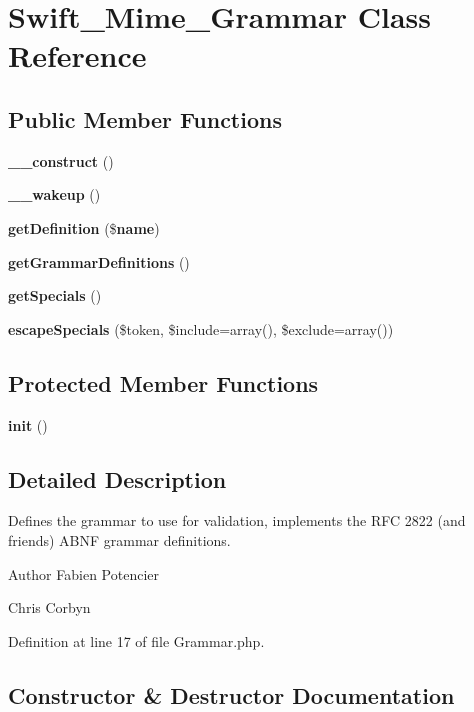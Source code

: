 \section{Swift\+\_\+\+Mime\+\_\+\+Grammar Class Reference}
\label{class_swift___mime___grammar}
\subsection*{Public Member Functions}
\begin{DoxyCompactItemize}
\item 
{\bf \+\_\+\+\_\+construct} ()
\item 
{\bf \+\_\+\+\_\+wakeup} ()
\item 
{\bf get\+Definition} (\${\bf name})
\item 
{\bf get\+Grammar\+Definitions} ()
\item 
{\bf get\+Specials} ()
\item 
{\bf escape\+Specials} (\$token, \$include=array(), \$exclude=array())
\end{DoxyCompactItemize}
\subsection*{Protected Member Functions}
\begin{DoxyCompactItemize}
\item 
{\bf init} ()
\end{DoxyCompactItemize}


\subsection{Detailed Description}
Defines the grammar to use for validation, implements the R\+F\+C 2822 (and friends) A\+B\+N\+F grammar definitions.

\begin{DoxyAuthor}{Author}
Fabien Potencier 

Chris Corbyn 
\end{DoxyAuthor}


Definition at line 17 of file Grammar.\+php.



\subsection{Constructor \& Destructor Documentation}
